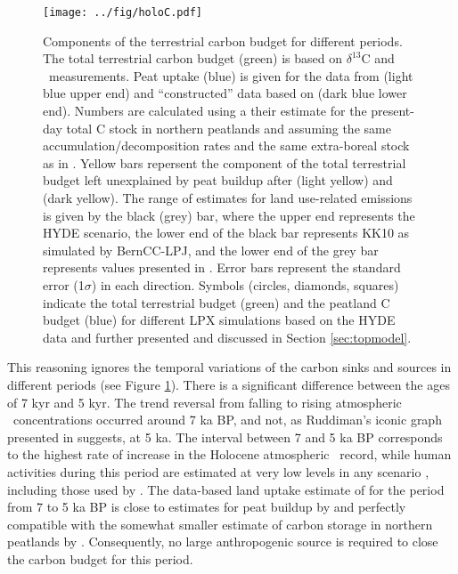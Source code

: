 \begin{figure}
\begin{center}
  \texttt{[image: ../fig/holoC.pdf]}
\end{center}
  \caption[Components of the terrestrial carbon budget for different Holocene  periods]{Components of the terrestrial carbon budget for different periods. The total terrestrial carbon budget (green) is based on $\delta^{13}$C and \coo\ measurements\citep{elsig}. Peat uptake (blue) is given for the data from \citet{yu11hol} (light blue upper end) and ``constructed'' data based on \citet{tarnocai09gbc} (dark blue lower end). Numbers are calculated using a their estimate for the present-day total C stock in northern peatlands and assuming the same accumulation/decomposition rates and the same extra-boreal stock as in \citet{yu11hol}. Yellow bars repersent the component of the total terrestrial budget left unexplained
by peat buildup after \citet{yu11hol} (light yellow) and \citet{tarnocai09gbc} (dark yellow). The range of estimates for land use-related emissions is given by the black (grey) bar, where the upper end represents the HYDE scenario, the lower end of the black bar represents KK10 as simulated by BernCC-LPJ, and the lower end of the grey bar represents values presented in \citet{kaplan09}. Error bars represent the standard error (1$\sigma$) in each direction. Symbols (circles, diamonds, squares) indicate the total terrestrial budget (green) and the peatland C budget (blue) for different LPX simulations based on the HYDE data and further presented and discussed in Section \ref{sec:topmodel}.}
\label{fig:holoC}
\end{figure}


This reasoning ignores the temporal variations of the carbon sinks and sources in different periods (see Figure \ref{fig:holoC}). There is a significant difference between the ages of 7 kyr and 5 kyr. The trend reversal from falling to rising atmospheric \coo\ concentrations occurred around 7 ka BP, and not, as Ruddiman's iconic graph presented in \citet{eah_realclimate} suggests, at 5 ka. The interval between 7 and 5 ka BP corresponds to the highest rate of increase in the Holocene atmospheric \coo\ record, while human activities during this period are estimated at very low levels in any scenario \citep{olofssonhickler2008, stocker11bg}, including those used by \citet{kaplan11}. The data-based land uptake estimate of \citet{elsig} for the period from 7 to 5 ka BP is close to estimates for peat buildup by \citet{yu11hol} and perfectly compatible with the somewhat smaller estimate of carbon storage in northern peatlands by \citet{tarnocai09gbc}. Consequently, no large anthropogenic source is required to close the carbon budget for this period.

